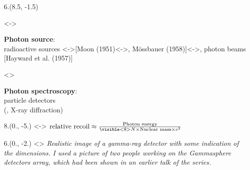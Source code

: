 \begin{textblock}{6.}(8.5, -1.5)
    \begin{itemize}
    \visible<\SLIDEPHOTONSOURCE->{
        \item \textbf{Photon source}: \\ 
        radioactive sources \visible<\SLIDEWHEEL->{[Moon (1951)\visible<\SLIDEMOESSBAUER->{, M\"ossbauer (1958)}]}\visible<\SLIDEBEAM->{, photon beams [Hayward et al. (1957)]}
    }
    \visible<\SLIDEDETECTION>{
        \item \textbf{Photon spectroscopy}: \\
        particle detectors \\(, X-ray diffraction)
    }
    \end{itemize}
\end{textblock}

\begin{textblock}{8.}(0., -5.)
    \visible<\SLIDERECOIL-\SLIDEMOESSBAUER>{
        $\text{relative recoil} \approx \frac{\text{Photon energy}}{\visible<\SLIDEMOESSBAUER>{N \times } \text{Nuclear mass} \times c^2}$
    }
\end{textblock}

\begin{textblock}{6.}(0., -2.)
    \visible<\SLIDEDETECTION>{
        \textit{Realistic image of a gamma-ray detector with some indication of the dimensions.
        I used a picture of two people working on the Gammasphere detectors array, which had been shown in an earlier talk of the series.}
    }
\end{textblock}